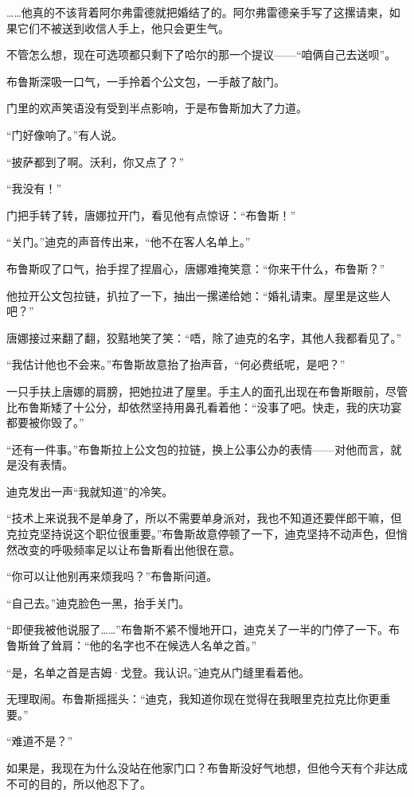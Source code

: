 \documentclass[../main]{subfiles}
\begin{document}
……他真的不该背着阿尔弗雷德就把婚结了的。阿尔弗雷德亲手写了这摞请柬，如果它们不被送到收信人手上，他只会更生气。

不管怎么想，现在可选项都只剩下了哈尔的那一个提议——“咱俩自己去送呗”。

布鲁斯深吸一口气，一手拎着个公文包，一手敲了敲门。

门里的欢声笑语没有受到半点影响，于是布鲁斯加大了力道。

“门好像响了。”有人说。

“披萨都到了啊。沃利，你又点了？”

“我没有！”

门把手转了转，唐娜拉开门，看见他有点惊讶：“布鲁斯！”

“关门。”迪克的声音传出来，“他不在客人名单上。”

布鲁斯叹了口气，抬手捏了捏眉心，唐娜难掩笑意：“你来干什么，布鲁斯？”

他拉开公文包拉链，扒拉了一下，抽出一摞递给她：“婚礼请柬。屋里是这些人吧？”

唐娜接过来翻了翻，狡黠地笑了笑：“唔，除了迪克的名字，其他人我都看见了。”

“我估计他也不会来。”布鲁斯故意抬了抬声音，“何必费纸呢，是吧？”

一只手扶上唐娜的肩膀，把她拉进了屋里。手主人的面孔出现在布鲁斯眼前，尽管比布鲁斯矮了十公分，却依然坚持用鼻孔看着他：“没事了吧。快走，我的庆功宴都要被你毁了。”

“还有一件事。”布鲁斯拉上公文包的拉链，换上公事公办的表情——对他而言，就是没有表情。

迪克发出一声“我就知道”的冷笑。

“技术上来说我不是单身了，所以不需要单身派对，我也不知道还要伴郎干嘛，但克拉克坚持说这个职位很重要。”布鲁斯故意停顿了一下，迪克坚持不动声色，但悄然改变的呼吸频率足以让布鲁斯看出他很在意。

“你可以让他别再来烦我吗？”布鲁斯问道。

“自己去。”迪克脸色一黑，抬手关门。

“即便我被他说服了\ldots\ldots”布鲁斯不紧不慢地开口，迪克关了一半的门停了一下。布鲁斯耸了耸肩：“他的名字也不在候选人名单之首。”

“是，名单之首是吉姆·戈登。我认识。”迪克从门缝里看着他。

无理取闹。布鲁斯摇摇头：“迪克，我知道你现在觉得在我眼里克拉克比你更重要。”

“难道不是？”

如果是，我现在为什么没站在他家门口？布鲁斯没好气地想，但他今天有个非达成不可的目的，所以他忍下了。
\end{document}
